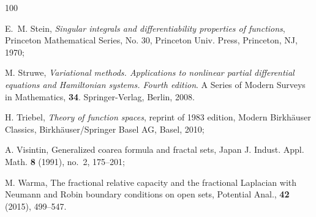 \documentclass{amsart}
\theoremstyle{definition}
\numberwithin{equation}{section}
\begin{document}
\begin{thebibliography}{100}
	
	 E.~M. Stein, {\it Singular integrals and differentiability properties of functions}, Princeton Mathematical Series, No. 30, Princeton Univ. Press, Princeton, NJ, 1970; 
	
	 M. Struwe, {\it Variational methods. Applications to nonlinear partial differential equations and Hamiltonian systems. Fourth edition}. A Series of Modern Surveys in Mathematics, {\bf 34}. Springer-Verlag, Berlin, 2008.
	
	
	 H. Triebel, {\it Theory of function spaces}, reprint of 1983 edition, 
	Modern Birkh\"auser Classics, Birkh\"auser/Springer Basel AG, Basel, 2010;
	
	 A. Visintin, Generalized coarea formula and fractal sets, Japan J. Indust. Appl. Math. {\bf 8} (1991), no.~2, 175--201; 
	
	 M. Warma, The fractional relative capacity and the fractional Laplacian with Neumann and Robin boundary conditions on open sets, Potential Anal., {\bf 42} (2015), 499--547.
	
	
\end{thebibliography}	
\end{document}
